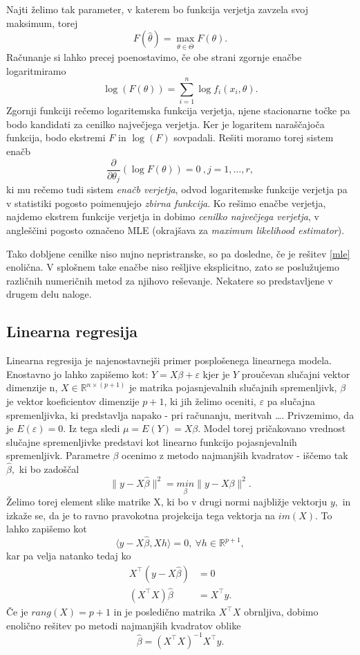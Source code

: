 \documentclass[12pt,a4paper]{amsart}
\theoremstyle{definition} %
\theoremstyle{plain} %
\begin{document}
Najti želimo tak parameter, v katerem bo funkcija verjetja zavzela svoj maksimum, torej 
\[
    F(\hat{\theta}) = \underset{\theta \in \overline{\Theta}}{\max}{F(\theta)}.
\]
Računanje si lahko precej poenostavimo, če obe strani zgornje enačbe logaritmiramo
\begin{equation}
    \log(F(\theta)) = \sum_{i=1}^{n}\log f_{i}(x_{i},\theta).
\end{equation}
Zgornji funkciji rečemo logaritemska funkcija verjetja, njene stacionarne točke pa bodo kandidati za cenilko največjega verjetja. Ker je logaritem 
naraščajoča funkcija, bodo ekstremi $F$ in $\log (F)$ sovpadali. Rešiti moramo torej sistem enačb
\begin{equation}\label{mle}
    \frac{\partial}{\partial \theta_{j}}(\log F(\theta)) = 0~,j=1,\ldots,r,
\end{equation}
ki mu rečemo tudi sistem \textit{enačb verjetja}, odvod logaritemske funkcije verjetja pa v statistiki pogosto poimenujejo \textit{zbirna funkcija}.
Ko rešimo enačbe verjetja, najdemo ekstrem funkcije verjetja in dobimo \textit{cenilko največjega verjetja}, v angleščini pogosto označeno MLE (okrajšava za
\textit{maximum likelihood estimator}).

Tako dobljene cenilke niso nujno nepristranske, so pa dosledne, če je rešitev \eqref{mle} enolična. V splošnem take enačbe niso rešljive eksplicitno, zato se poslužujemo različnih
numeričnih metod za njihovo reševanje. Nekatere so predstavljene v drugem delu naloge.

\subsection{Linearna regresija} %
Linearna regresija je najenostavnejši primer posplošenega linearnega modela. Enostavno jo lahko zapišemo kot:
$
    Y = X \beta + \varepsilon
$
kjer je $Y$ proučevan slučajni vektor dimenzije n, $X \in \mathbb{R}^{n\times (p+1)} $ je matrika pojasnjevalnih slučajnih spremenljivk, $\beta$ je vektor koeficientov dimenzije $p+1$, 
ki jih želimo oceniti, $\varepsilon$ pa slučajna spremenljivka, ki predstavlja napako - pri računanju, meritvah \ldots. Privzemimo, da je $E(\varepsilon) = 0$. Iz tega sledi
$\mu = E(Y) = X\beta$. Model torej pričakovano vrednost slučajne spremenljivke predstavi kot linearno funkcijo pojasnjevalnih spremenljivk.
Parametre $\beta$ ocenimo z metodo najmanjših kvadratov - iščemo tak $\hat{\beta}, $ ki bo zadoščal
\[
    \lVert y - X\hat{\beta} \rVert^2 = \underset{\beta}{min}\lVert y-X\beta\rVert^2.
\]
Želimo torej element slike matrike X, ki bo v drugi normi najbližje vektorju $y, $ in izkaže se, da je to ravno pravokotna projekcija tega vektorja na $im(X).$ To lahko zapišemo kot
\[
    \langle y-X\hat{\beta}, Xh \rangle = 0,~\forall h\in\mathbb{R}^{p+1},
\]
kar pa velja natanko tedaj ko
\begin{align*}
    X^\top(y-X\hat{\beta}) &= 0 \\
    (X^\top X)\hat{\beta} &= X^\top y.
\end{align*}
Če je $rang(X) = p+1$ in je posledično matrika $X^\top X$ obrnljiva, dobimo enolično rešitev po metodi najmanjših kvadratov oblike 
\[
    \hat{\beta} =  (X^\top X)^{-1}X^\top y.
\]
\end{document}
